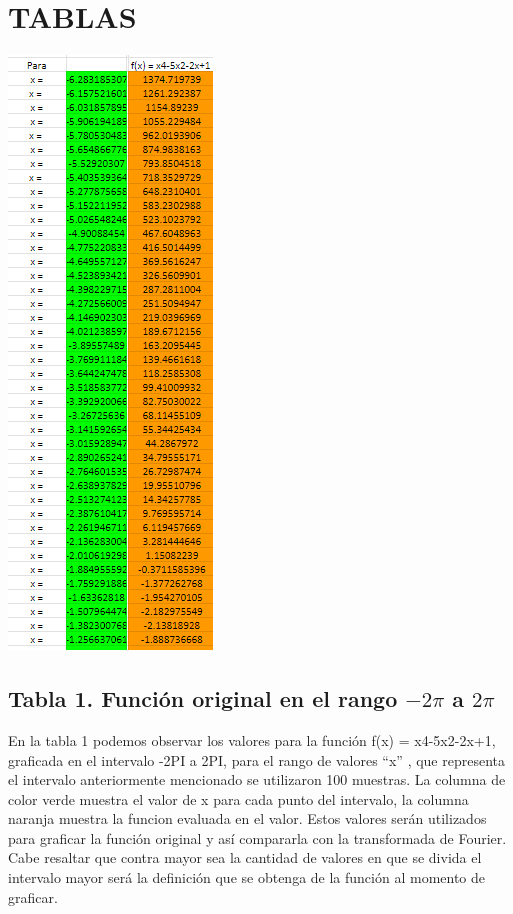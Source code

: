 
\section{TABLAS}\label{tablas}

\includegraphics[width=2.13542in,height=6.19792in]{media/image23.png}

\subsection{Tabla 1. Función original en el rango \(-2\pi\) a \(2\pi\)}\label{tabla-1.-funciuxf3n-original-en-el-rango--2pi-a-2pi}

En la tabla 1 podemos observar los valores para la función f(x) = x4-5x2-2x+1, graficada en el intervalo -2PI a 2PI, para el rango de valores ``x'' , que representa el intervalo anteriormente mencionado se utilizaron 100 muestras. La columna de color verde muestra el valor de x para cada punto del intervalo, la columna naranja muestra la funcion evaluada en el valor. Estos valores serán utilizados para graficar la función original y así compararla con la transformada de Fourier. Cabe resaltar que contra mayor sea la cantidad de valores en que se divida el intervalo mayor será la definición que se obtenga de la función al momento de graficar.

